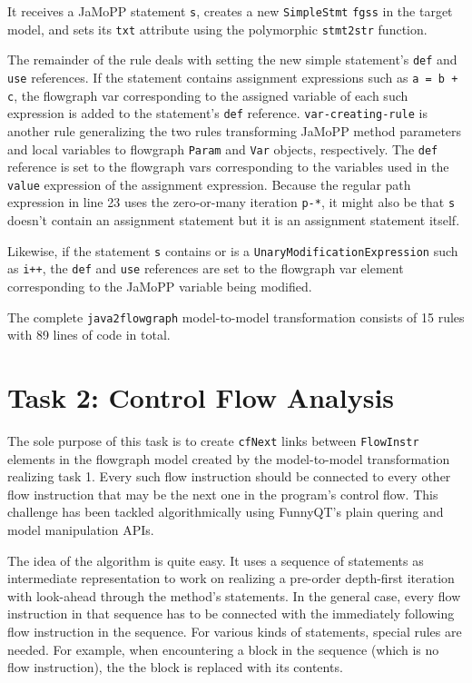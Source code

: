 \documentclass[11pt]{article}
\begin{document}
It receives a JaMoPP statement \verb|s|, creates a new \verb|SimpleStmt|
\verb|fgss| in the target model, and sets its \verb|txt| attribute using the
polymorphic \verb|stmt2str| function.

The remainder of the rule deals with setting the new simple statement's
\verb|def| and \verb|use| references.  If the statement contains assignment
expressions such as \verb|a = b + c|, the flowgraph var corresponding to the
assigned variable of each such expression is added to the statement's
\verb|def| reference.  \verb|var-creating-rule| is another rule generalizing
the two rules transforming JaMoPP method parameters and local variables to
flowgraph \verb|Param| and \verb|Var| objects, respectively.  The \verb|def|
reference is set to the flowgraph vars corresponding to the variables used in
the \verb|value| expression of the assignment expression.  Because the regular
path expression in line 23 uses the zero-or-many iteration \verb|p-*|, it might
also be that \verb|s| doesn't contain an assignment statement but it is an
assignment statement itself.

Likewise, if the statement \verb|s| contains or is a
\verb|UnaryModificationExpression| such as \verb|i++|, the \verb|def| and
\verb|use| references are set to the flowgraph var element corresponding to the
JaMoPP variable being modified.

The complete \verb|java2flowgraph| model-to-model transformation consists of 15
rules with 89 lines of code in total.



\section{Task 2: Control Flow Analysis}
\label{sec:task-2}

The sole purpose of this task is to create \verb|cfNext| links between
\verb|FlowInstr| elements in the flowgraph model created by the model-to-model
transformation realizing task 1.  Every such flow instruction should be
connected to every other flow instruction that may be the next one in the
program's control flow.  This challenge has been tackled algorithmically using
FunnyQT's plain quering and model manipulation APIs.

The idea of the algorithm is quite easy.  It uses a sequence of statements as
intermediate representation to work on realizing a pre-order depth-first
iteration with look-ahead through the method's statements.  In the general
case, every flow instruction in that sequence has to be connected with the
immediately following flow instruction in the sequence.  For various kinds of
statements, special rules are needed.  For example, when encountering a block
in the sequence (which is no flow instruction), the the block is replaced with
its contents.
\end{document}
